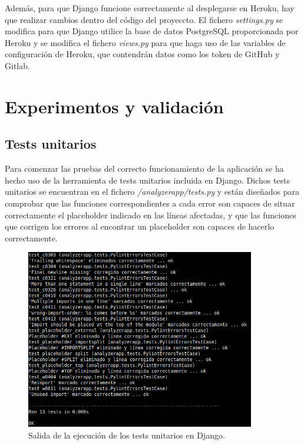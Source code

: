 \documentclass[a4paper, 12pt]{book}
\begin{document}
Además, para que Django funcione correctamente al desplegarse en Heroku, hay que realizar cambios dentro del código del proyeccto.
El fichero \textit{settings.py} se modifica para que Django utilice la base de datos PostgreSQL proporcionada por Heroku y se modifica el fichero \textit{views.py} para que haga uso de las variables de configuración de Heroku, que contendrán datos como los token de GitHub y Gitlab.


\cleardoublepage
\chapter{Experimentos y validación}
\label{chap:experimentos}

\section{Tests unitarios}
\label{sec:tests_unitarios}

Para comenzar las pruebas del correcto funcionamiento de la aplicación se ha hecho uso de la herramienta de tests unitarios incluida en Django.
Dichos tests unitarios se encuentran en el fichero \textit{/analyzerapp/tests.py} y están diseñados para comprobar que las funciones correspondientes a cada error son capaces de situar correctamente el placeholder indicado en las líneas afectadas, y que las funciones que corrigen los errores al encontrar un placeholder son capaces de hacerlo correctamente.
\begin{figure}[h]
  \centering
  \includegraphics[width=10cm, keepaspectratio]{img/tests.png}
  \caption{Salida de la ejecución de los tests unitarios en Django.}\label{fig:tests}
\end{figure}
\end{document}
